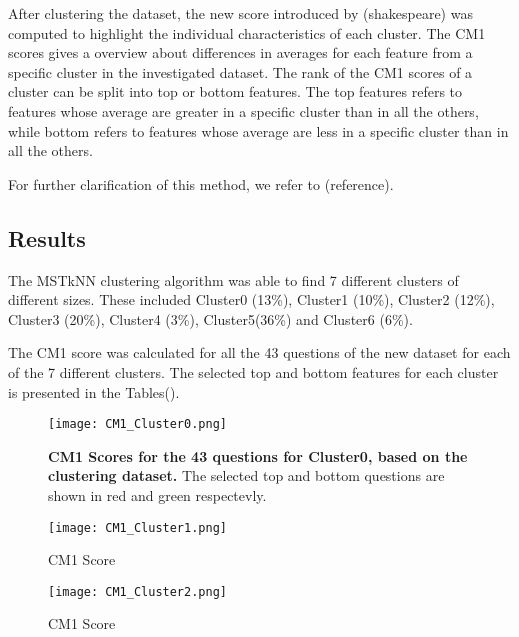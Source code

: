 \documentclass{article}
\begin{document}


After clustering the dataset, the new score introduced by (shakespeare) was
computed to highlight the individual characteristics of each cluster. The CM1
scores gives a overview about differences in averages for each feature from a
specific cluster in the investigated dataset. The rank of the CM1 scores of a
cluster can be split into top or bottom features. The top features refers to
features whose average are greater in a specific cluster than in all the others,
while bottom refers to features whose average are less in a specific cluster
than in all the others.






For further clarification of this method, we refer to (reference). 


\subsection{Results}

The MSTkNN clustering algorithm was able to find 7 different clusters of
different sizes. These included Cluster0 (13\%), Cluster1 (10\%), Cluster2
(12\%), Cluster3 (20\%), Cluster4 (3\%), Cluster5(36\%) and Cluster6 (6\%).

The CM1 score was calculated for all the 43 questions of the new dataset
for each of the 7 different clusters. The selected top and bottom features  
for each cluster is presented in the Tables().

\begin{figure}[h]
	\texttt{[image: CM1\_Cluster0.png]}
	\caption{\textbf{CM1 Scores for the 43 questions for Cluster0, based on the
	clustering dataset.} The selected top and bottom questions are shown in red
	and green respectevly.}
	\label{fig:Cluster0}
\end{figure}

\begin{figure}[h]
	\texttt{[image: CM1\_Cluster1.png]}
	\caption{CM1 Score}
	\label{fig:Cluster1}
\end{figure}

\begin{figure}[h]
	\texttt{[image: CM1\_Cluster2.png]}
	\caption{CM1 Score}
	\label{fig:Cluster2}
\end{figure}
\end{document}
